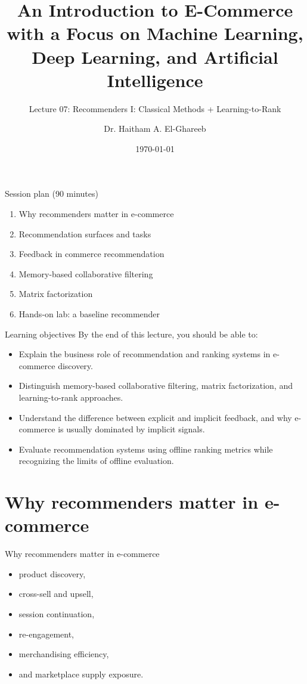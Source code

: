 \documentclass[aspectratio=169]{beamer}
\title[Lecture 07]{An Introduction to E-Commerce\\\small with a Focus on Machine Learning, Deep Learning, and Artificial Intelligence}
\subtitle{Lecture 07: Recommenders I: Classical Methods + Learning-to-Rank}
\author{Dr. Haitham A. El-Ghareeb}
\institute{Faculty of Computers and Information Sciences \\ Mansoura University \\ Egypt}
\date{\today}
\begin{document}
\begin{frame}
  \titlepage
\end{frame}

\begin{frame}{Session plan (90 minutes)}
  \begin{enumerate}
    \item Why recommenders matter in e-commerce
    \item Recommendation surfaces and tasks
    \item Feedback in commerce recommendation
    \item Memory-based collaborative filtering
    \item Matrix factorization
    \item Hands-on lab: a baseline recommender
  \end{enumerate}
\end{frame}

\begin{frame}{Learning objectives}
  By the end of this lecture, you should be able to:
  \begin{itemize}
    \item Explain the business role of recommendation and ranking systems in e-commerce discovery.
    \item Distinguish memory-based collaborative filtering, matrix factorization, and learning-to-rank approaches.
    \item Understand the difference between explicit and implicit feedback, and why e-commerce is usually dominated by implicit signals.
    \item Evaluate recommendation systems using offline ranking metrics while recognizing the limits of offline evaluation.
  \end{itemize}
\end{frame}

\section{Why recommenders matter in e-commerce}

\begin{frame}{Why recommenders matter in e-commerce}
  \begin{itemize}
    \item product discovery,
    \item cross-sell and upsell,
    \item session continuation,
    \item re-engagement,
    \item merchandising efficiency,
    \item and marketplace supply exposure.
  \end{itemize}
\end{frame}
\end{document}
